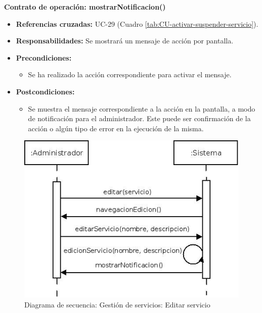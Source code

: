 \textbf{Contrato de operación: mostrarNotificacion()}
\begin{itemize}
\item \textbf{Referencias cruzadas:} UC-29 (Cuadro \ref{tab:CU-activar-suspender-servicio}).
\item \textbf{Responsabilidades:} Se mostrará un mensaje de acción por pantalla.
\item \textbf{Precondiciones:} 
 \begin{itemize}
\item Se ha realizado la acción correspondiente para activar el mensaje.
\end {itemize}
\item \textbf{Postcondiciones:} 
 \begin{itemize}
\item Se muestra el mensaje correspondiente a la acción en la pantalla, a modo de notificación para el administrador. Este puede ser confirmación de la acción o algún tipo de error en la ejecución de la misma.
\end {itemize}
\end {itemize}


\vspace{10mm}

\begin{figure}[H]
\centering
  \includegraphics[scale=.55]{img/secuencias/gestion-servicios-editar-servicio.jpeg}
  \caption{Diagrama de secuencia: Gestión de servicios: Editar servicio}
  \label{fig:secuencia-gestion-servicios-editar-servicio}
\end{figure}

